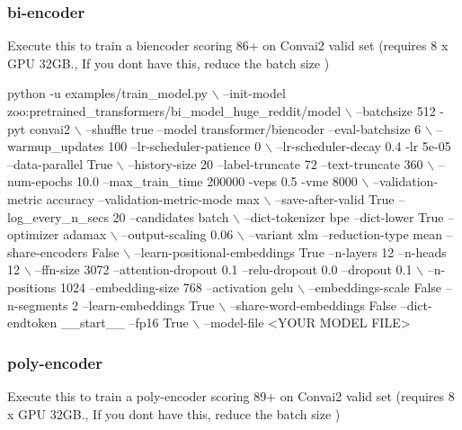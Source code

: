 \subsubsection*{bi-\/encoder}

Execute this to train a biencoder scoring 86+ on Convai2 valid set (requires 8 x G\+PU 32\+GB., If you don\textquotesingle{}t have this, reduce the batch size )


\begin{DoxyCode}
python -u examples/train\_model.py \(\backslash\)
    --init-model zoo:pretrained\_transformers/bi\_model\_huge\_reddit/model \(\backslash\)
    --batchsize 512 -pyt convai2 \(\backslash\)
    --shuffle true --model transformer/biencoder --eval-batchsize 6 \(\backslash\)
    --warmup\_updates 100 --lr-scheduler-patience 0 \(\backslash\)
    --lr-scheduler-decay 0.4 -lr 5e-05 --data-parallel True \(\backslash\)
    --history-size 20 --label-truncate 72 --text-truncate 360 \(\backslash\)
    --num-epochs 10.0 --max\_train\_time 200000 -veps 0.5 -vme 8000 \(\backslash\)
    --validation-metric accuracy --validation-metric-mode max \(\backslash\)
    --save-after-valid True --log\_every\_n\_secs 20 --candidates batch \(\backslash\)
    --dict-tokenizer bpe --dict-lower True --optimizer adamax \(\backslash\)
    --output-scaling 0.06 \(\backslash\)
     --variant xlm --reduction-type mean --share-encoders False \(\backslash\)
     --learn-positional-embeddings True --n-layers 12 --n-heads 12 \(\backslash\)
     --ffn-size 3072 --attention-dropout 0.1 --relu-dropout 0.0 --dropout 0.1 \(\backslash\)
     --n-positions 1024 --embedding-size 768 --activation gelu \(\backslash\)
     --embeddings-scale False --n-segments 2 --learn-embeddings True \(\backslash\)
     --share-word-embeddings False --dict-endtoken \_\_start\_\_ --fp16 True \(\backslash\)
     --model-file <YOUR MODEL FILE>
\end{DoxyCode}


\subsubsection*{poly-\/encoder}

Execute this to train a poly-\/encoder scoring 89+ on Convai2 valid set (requires 8 x G\+PU 32\+GB., If you don\textquotesingle{}t have this, reduce the batch size )


